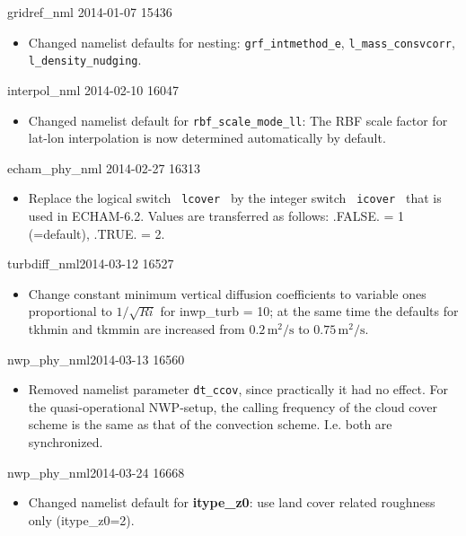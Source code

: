 \begin{changeitem}{gridref\_nml}{ 2014-01-07 }{ 15436 }
  \begin{itemize}
   \item Changed namelist defaults for nesting: \texttt{grf\_intmethod\_e}, \texttt{l\_mass\_consvcorr}, \texttt{l\_density\_nudging}.
  \end{itemize}
\end{changeitem}


\begin{changeitem}{interpol\_nml}{ 2014-02-10 }{ 16047 }
  \begin{itemize}
   \item Changed namelist default for \texttt{rbf\_scale\_mode\_ll}: The RBF scale factor for lat-lon interpolation is now
      determined automatically by default.
  \end{itemize}
\end{changeitem}


\begin{changeitem}{echam\_phy\_nml}{ 2014-02-27 }{ 16313 }
  \begin{itemize}
   \item Replace the logical switch \texttt{ lcover } by the integer switch \texttt{ icover } that is used in ECHAM-6.2. Values are transferred as follows: .FALSE. = 1 (=default), .TRUE. = 2.
  \end{itemize}
\end{changeitem}

\begin{changeitem}{turbdiff\_nml}{2014-03-12 }{16527 }
  \begin{itemize}
   \item Change constant minimum vertical diffusion coefficients to variable ones proportional to $1/\sqrt{Ri}$ for inwp\_turb = 10; at the same time
         the defaults for tkhmin and tkmmin are increased from $0.2 \, \mathrm{m^2/s}$ to $0.75 \, \mathrm{m^2/s}$.
  \end{itemize}
\end{changeitem}

\begin{changeitem}{nwp\_phy\_nml}{2014-03-13 }{16560 }
  \begin{itemize}
   \item Removed namelist parameter \texttt{dt\_ccov}, since practically it had no effect. For the  quasi-operational NWP-setup, the calling frequency of the cloud cover scheme is the same as that of the convection scheme. I.e. both are synchronized.
  \end{itemize}
\end{changeitem}

\begin{changeitem}{nwp\_phy\_nml}{2014-03-24 }{16668 }
  \begin{itemize}
   \item Changed namelist default for \textbf{itype\_z0}: use land cover related roughness only (itype\_z0=2).
  \end{itemize}
\end{changeitem}

